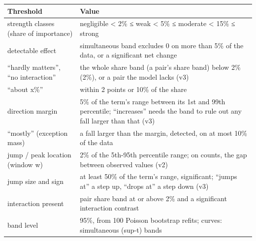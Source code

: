 \begin{tabular}{p{4.2cm}p{10.8cm}}
\toprule
\textbf{Threshold} & \textbf{Value} \\
\midrule
strength classes (share of importance) & negligible < 2\% ≤ weak < 5\% ≤ moderate < 15\% ≤ strong \\
detectable effect & simultaneous band excludes 0 on more than 5\% of the data, or a significant net change \\
“hardly matters”, “no interaction” & the whole share band (a pair's share band) below 2\% (2\%), or a pair the model lacks (v3) \\
“about x\%” & within 2 points or 10\% of the share \\
direction margin & 5\% of the term's range between its 1st and 99th percentile; “increases” needs the band to rule out any fall larger than that (v3) \\
“mostly” (exception mass) & a fall larger than the margin, detected, on at most 10\% of the data \\
jump / peak location (window w) & 2\% of the 5th-95th percentile range; on counts, the gap between observed values (v2) \\
jump size and sign & at least 50\% of the term's range, significant; “jumps at” a step up, “drops at” a step down (v3) \\
interaction present & pair share band at or above 2\% and a significant interaction contrast \\
band level & 95\%, from 100 Poisson bootstrap refits; curves: simultaneous (sup-t) bands \\
\bottomrule
\end{tabular}
